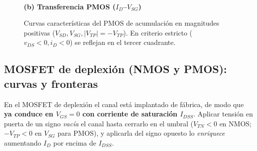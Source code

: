 \documentclass[11pt,a4paper]{article}
\begin{document}
\begin{figure}[H]
\begin{minipage}[t]{0.42\textwidth}
\\[0.4em]
			\small\textbf{(b) Transferencia PMOS ($I_D$--$V_{SG}$)}
		\end{minipage}
		\caption{Curvas características del PMOS de acumulación en magnitudes positivas ($V_{SD}, V_{SG}, |V_{TP}| = -V_{TP}$). En criterio estricto ($v_{DS} < 0, i_D < 0$) se reflejan en el tercer cuadrante.}
	\end{figure}

	\subsection{MOSFET de deplexión (NMOS y PMOS): curvas y fronteras}

	En el MOSFET de deplexión el canal está implantado de fábrica, de modo que \textbf{ya conduce en $V_{GS} = 0$ con corriente de saturación $I_{DSS}$}. Aplicar tensión en puerta de un signo \emph{vacía} el canal hasta cerrarlo en el umbral ($V_{TN} < 0$ en NMOS; $-V_{TP} < 0$ en $V_{SG}$ para PMOS), y aplicarla del signo opuesto lo \emph{enriquece} aumentando $I_D$ por encima de $I_{DSS}$.
\end{document}
